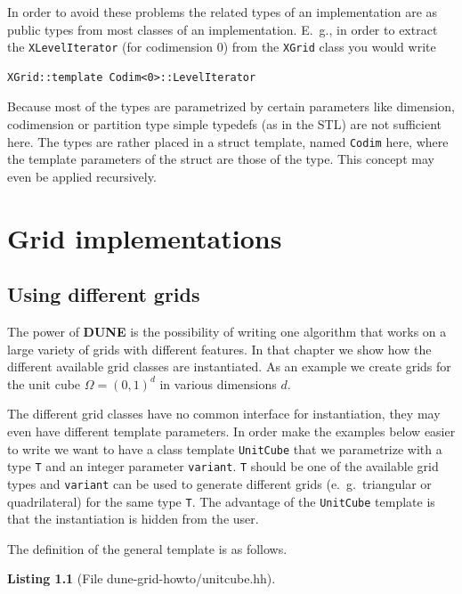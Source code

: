 \documentclass[11pt,a4paper,headinclude,footinclude,DIV16,normalheadings]{scrreprt}
\newcommand{\Dune}{{\sf\bfseries DUNE}}
\newtheorem{lst}{Listing}
\begin{document}
In order to avoid these problems the related types of an
implementation are as public types from most classes of an
implementation. E.~g., in order to extract the
\lstinline!XLevelIterator! (for codimension 0) from the
\lstinline!XGrid! class you would write
\begin{lstlisting}
XGrid::template Codim<0>::LevelIterator
\end{lstlisting}
Because most of the types are parametrized by certain parameters like
dimension, codimension or partition type simple typedefs (as in the
STL) are not sufficient here. The types are rather placed in a
struct template, named \lstinline!Codim! here, where the template
parameters of the struct are those of the type. This concept may even
be applied recursively. 



\chapter{Grid implementations}

\section{Using different grids}

The power of \Dune{} is the possibility of writing one algorithm that
works on a large variety of grids with different
features. In that chapter we show how the different available grid
classes are instantiated. As an example we create grids for the unit
cube $\Omega=(0,1)^d$ in various dimensions $d$.

The different grid classes have no common interface for instantiation,
they may even have different template parameters. In order make the
examples below easier to write we want to have a class template
\lstinline!UnitCube! that we parametrize with a type \lstinline!T! and
an integer parameter \lstinline!variant!. \lstinline!T! should be
one of the available grid types and \lstinline!variant! can be used to
generate different grids (e.~g.~triangular or quadrilateral) for the
same type \lstinline!T!. The advantage of the \lstinline!UnitCube!
template is that the instantiation is hidden from the user.

The definition of the general template is as follows.

\begin{lst}[File dune-grid-howto/unitcube.hh] \mbox{}
\nopagebreak

\end{lst}
\end{document}
